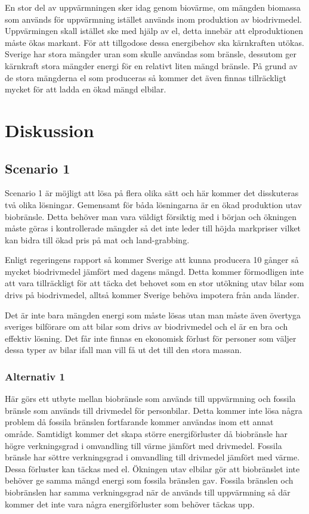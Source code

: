 \documentclass[a4paper,11pt,fleqn, titlepage]{article}
\begin{document}
En stor del av uppvärmningen sker idag genom biovärme, om mängden biomassa som används för uppvärmning istället används inom produktion av biodrivmedel. Uppvärmingen skall istället ske med hjälp av el, detta innebär att elproduktionen måste ökas markant. För att tillgodose dessa energibehov ska kärnkraften utökas. Sverige har stora mängder uran som skulle användas som bränsle, dessutom ger kärnkraft stora mängder energi för en relativt liten mängd bränsle. På grund av de stora mängderna el som produceras så kommer det även finnas tillräckligt mycket för att ladda en ökad mängd elbilar.


\section{Diskussion}

\subsection{Scenario 1}
Scenario 1 är möjligt att lösa på flera olika sätt och här kommer det disskuteras två olika lösningar. Gemensamt för båda lösningarna är en ökad produktion utav biobränsle. Detta behöver man vara väldigt försiktig med i början och ökningen måste göras i kontrollerade mängder så det inte leder till höjda markpriser vilket kan bidra till ökad pris på mat och land-grabbing.

Enligt regeringens rapport så kommer Sverige att kunna producera 10 gånger så mycket biodrivmedel jämfört med dagens mängd. Detta kommer förmodligen inte att vara tillräckligt för att täcka det behovet som en stor utökning utav bilar som drivs på biodrivmedel, alltså kommer Sverige behöva impotera från anda länder.

Det är inte bara mängden energi som måste lösas utan man måste även övertyga sveriges bilförare om att bilar som drivs av biodrivmedel och el är en bra och effektiv lösning.
Det får inte finnas en ekonomisk förlust för personer som väljer dessa typer av bilar ifall man vill få ut det till den stora massan.

\subsubsection{Alternativ 1}
Här görs ett utbyte mellan biobränsle som används till uppvärmning och fossila bränsle som används till drivmedel för personbilar. Detta kommer inte lösa några problem då fossila bränslen fortfarande kommer användas inom ett annat område. Samtidigt kommer det skapa större energiförluster då biobränsle har högre verkningsgrad i omvandling till värme jämfört med drivmedel. Fossila bränsle har söttre verkningsgrad i omvandling till drivmedel jämfört med värme. Dessa förluster kan täckas med el. Ökningen utav elbilar gör att biobränslet inte behöver ge samma mängd energi som fossila bränslen gav. Fossila bränslen och biobränslen har samma verkningsgrad när de används till uppvärmning så där kommer det inte vara några energiförluster som behöver täckas upp.
\end{document}
